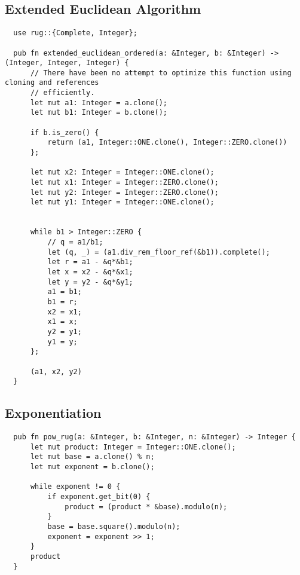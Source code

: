 \subsection{Extended Euclidean Algorithm}
\label{sec:ext-euclid-alg}
\begin{verbatim}
  use rug::{Complete, Integer};

  pub fn extended_euclidean_ordered(a: &Integer, b: &Integer) -> (Integer, Integer, Integer) {
      // There have been no attempt to optimize this function using cloning and references
      // efficiently.
      let mut a1: Integer = a.clone();
      let mut b1: Integer = b.clone();

      if b.is_zero() {
          return (a1, Integer::ONE.clone(), Integer::ZERO.clone())
      };

      let mut x2: Integer = Integer::ONE.clone();
      let mut x1: Integer = Integer::ZERO.clone();
      let mut y2: Integer = Integer::ZERO.clone();
      let mut y1: Integer = Integer::ONE.clone();


      while b1 > Integer::ZERO {
          // q = a1/b1;
          let (q, _) = (a1.div_rem_floor_ref(&b1)).complete();
          let r = a1 - &q*&b1;
          let x = x2 - &q*&x1;
          let y = y2 - &q*&y1;
          a1 = b1;
          b1 = r;
          x2 = x1;
          x1 = x;
          y2 = y1;
          y1 = y;
      };

      (a1, x2, y2)
  }
\end{verbatim}


\subsection{Exponentiation}
\label{sec:exp}

\begin{verbatim}
  pub fn pow_rug(a: &Integer, b: &Integer, n: &Integer) -> Integer {
      let mut product: Integer = Integer::ONE.clone();
      let mut base = a.clone() % n;
      let mut exponent = b.clone();

      while exponent != 0 {
          if exponent.get_bit(0) {
              product = (product * &base).modulo(n);
          }
          base = base.square().modulo(n);
          exponent = exponent >> 1;
      }
      product
  }
\end{verbatim}
